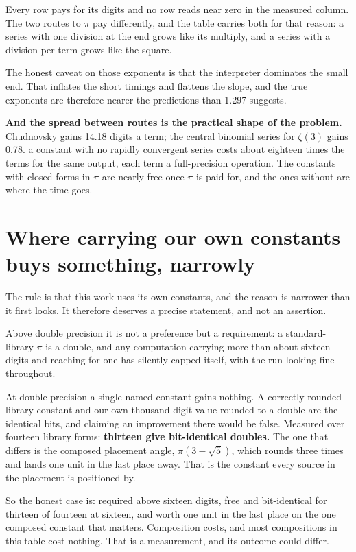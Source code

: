 Every row pays for its digits and no row reads near zero in the measured column. The two routes to
\(\pi\) pay differently, and the table carries both for that reason: a series with one division at the end
grows like its multiply, and a series with a division per term grows like the square.

The honest caveat on those exponents is that the interpreter dominates the small end. That inflates
the short timings and flattens the slope, and the true exponents are therefore nearer the predictions than 1.297
suggests.

\textbf{And the spread between routes is the practical shape of the problem.} Chudnovsky gains 14.18
digits a term; the central binomial series for \(\zeta(3)\) gains 0.78. a constant with no rapidly
convergent series costs about eighteen times the terms for the same output, each term a full-precision
operation. The constants with closed forms in \(\pi\) are nearly free once \(\pi\) is paid for, and
the ones without are where the time goes.

\section{Where carrying our own constants buys something, narrowly}

The rule is that this work uses its own constants, and the reason is narrower than it first looks. It
therefore deserves a precise statement, and not an assertion.

Above double precision it is not a preference but a requirement: a standard-library \(\pi\) is a
double, and any computation carrying more than about sixteen digits and reaching for one has silently
capped itself, with the run looking fine throughout.

At double precision a single named constant gains nothing. A correctly rounded library constant and
our own thousand-digit value rounded to a double are the identical bits, and claiming an improvement
there would be false. Measured over fourteen library forms: \textbf{thirteen give bit-identical
doubles.} The one that differs is the composed placement angle, \(\pi(3-\sqrt5)\), which rounds three
times and lands one unit in the last place away. That is the constant every source in the placement
is positioned by.

So the honest case is: required above sixteen digits, free and bit-identical for thirteen of fourteen
at sixteen, and worth one unit in the last place on the one composed constant that matters.
Composition costs, and most compositions in this table cost nothing. That is a measurement,
and its outcome could differ.


